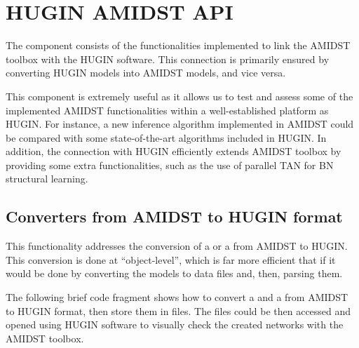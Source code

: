 \section{HUGIN AMIDST API} \label{sec:HuginLink}

The  component consists of the functionalities implemented to link the AMIDST toolbox with the HUGIN software. This connection is primarily ensured by converting HUGIN models into AMIDST models, and vice versa. 

This component is extremely useful as it allows us to test and assess some of the implemented AMIDST functionalities within a well-established platform as HUGIN. For instance, a new inference algorithm implemented in AMIDST could be compared with some state-of-the-art algorithms included in HUGIN. In addition, the connection with HUGIN efficiently extends AMIDST toolbox by providing some extra functionalities, such as the use of parallel TAN for BN structural learning. 

\subsection{Converters from AMIDST to HUGIN format} \label{ConverterFromAmidstToHugin}

This functionality addresses the conversion of a  or a  from AMIDST to HUGIN. This conversion is done at ``object-level'', which is far more efficient that if it would be done by converting the models to data files and, then, parsing them. 

The following brief code fragment shows how to convert a  and a  from AMIDST to HUGIN format, then store them in files. The files could be then accessed and opened using HUGIN software to visually check the created networks with the AMIDST toolbox. 


